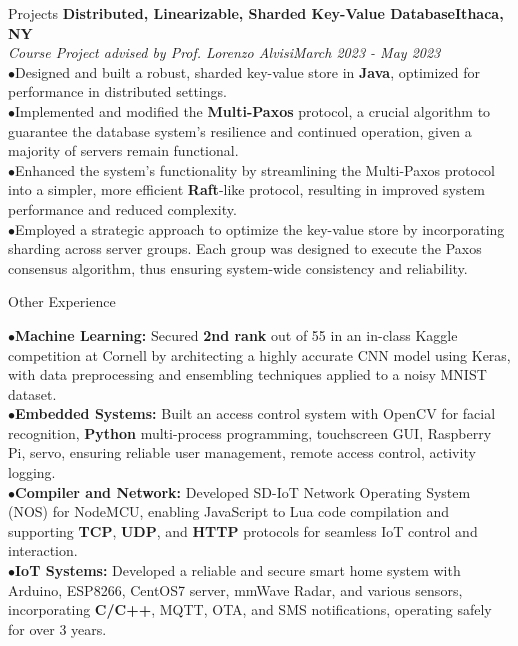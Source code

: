 \documentclass{resume} %
\begin{document}
\begin{rSection}{Projects}
{\bf Distributed, Linearizable, Sharded Key-Value Database}\hfill{\textbf{Ithaca, NY}}
\\{\em Course Project advised by Prof. Lorenzo Alvisi}\hfill {\em March 2023 - May 2023}
\\ $ \bullet $Designed and built a robust, sharded key-value store in \textbf{Java}, optimized for performance in distributed settings.
\\ $ \bullet $Implemented and modified the \textbf{Multi-Paxos} protocol, a crucial algorithm to guarantee the database system's resilience and continued operation, given a majority of servers remain functional.
\\ $ \bullet $Enhanced the system's functionality by streamlining the Multi-Paxos protocol into a simpler, more efficient \textbf{Raft}-like protocol, resulting in improved system performance and reduced complexity.
\\ $ \bullet $Employed a strategic approach to optimize the key-value store by incorporating sharding across server groups. Each group was designed to execute the Paxos consensus algorithm, thus ensuring system-wide consistency and reliability.

\end{rSection}

\begin{rSection}{Other Experience}

$ \bullet $\textbf{Machine Learning:} Secured \textbf{2nd rank} out of 55 in an in-class Kaggle competition at Cornell by architecting a highly accurate CNN model using Keras, with data preprocessing and ensembling techniques applied to a noisy MNIST dataset.
\\ $ \bullet $\textbf{Embedded Systems:} Built an access control system with OpenCV for facial recognition, \textbf{Python} multi-process programming, touchscreen GUI, Raspberry Pi, servo, ensuring reliable user management, remote access control, activity logging.
\\ $ \bullet $\textbf{Compiler and Network:} Developed SD-IoT Network Operating System (NOS) for NodeMCU, enabling JavaScript to Lua code compilation and supporting \textbf{TCP}, \textbf{UDP}, and \textbf{HTTP} protocols for seamless IoT control and interaction.
\\ $ \bullet $\textbf{IoT Systems:} Developed a reliable and secure smart home system with Arduino, ESP8266, CentOS7 server, mmWave Radar, and various sensors, incorporating \textbf{C/C++}, MQTT, OTA, and SMS notifications, operating safely for over 3 years.


\end{rSection}

\newpage
\end{document}
